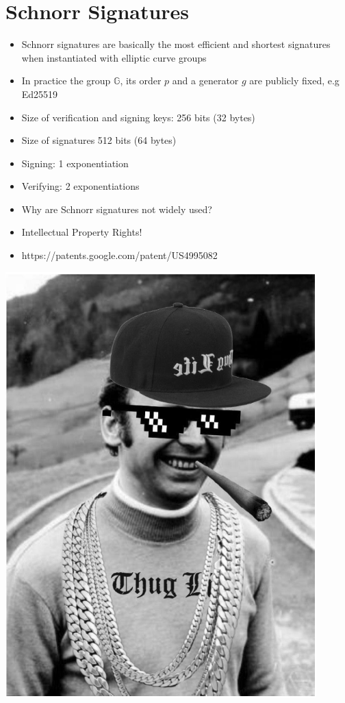     \section{Schnorr Signatures}
        \begin{itemize}
            \item Schnorr signatures are basically the most efficient and shortest signatures when instantiated with elliptic curve groups
            \item In practice the group $\mathbb{G}$, its order $p$ and a generator $g$ are publicly fixed, e.g Ed25519
            \item Size of verification and signing keys: 256 bits (32 bytes)
            \item Size of signatures 512 bits (64 bytes)
            \item Signing: 1 exponentiation
            \item Verifying: 2 exponentiations
            \item Why are Schnorr signatures not widely used?
            \item Intellectual Property Rights!
            \item https://patents.google.com/patent/US4995082
        \end{itemize}
        \begin{center}
            \includegraphics[width=120mm]{Graphics/Digital Signatures/fst4.png}
        \end{center}

